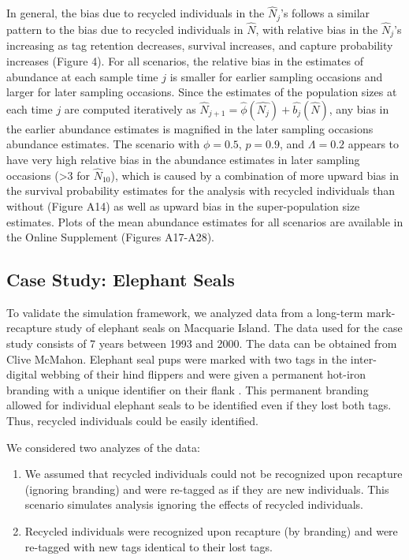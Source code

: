 \documentclass[12pt]{article}
\begin{document}
In general, the bias due to recycled individuals in the \(\hat{N}_j\)'s
follows a similar pattern to the bias due to recycled individuals in
\(\hat{N}\), with relative bias in the \(\hat{N}_j\)'s increasing as tag
retention decreases, survival increases, and capture probability
increases (Figure 4). For all scenarios, the relative bias in the
estimates of abundance at each sample time \(j\) is smaller for earlier
sampling occasions and larger for later sampling occasions. Since the
estimates of the population sizes at each time \(j\) are computed
iteratively as
\(\hat{N}_{j+1}=\hat{\phi}(\hat{N_j})+\hat{b_j}(\hat{N})\), any bias in
the earlier abundance estimates is magnified in the later sampling
occasions abundance estimates. The scenario with \(\phi=0.5\),
\(p=0.9\), and \(\Lambda=0.2\) appears to have very high relative bias
in the abundance estimates in later sampling occasions (\textgreater{}3
for \(\hat{N}_{10}\)), which is caused by a combination of more upward
bias in the survival probability estimates for the analysis with recycled
individuals than without (Figure A14) as well as upward bias in the
super-population size estimates. Plots of the mean abundance estimates
for all scenarios are available in the Online Supplement (Figures A17-A28).

\subsection{Case Study: Elephant
Seals}\label{case-study-elephant-seals-1}


To validate the simulation framework, we analyzed data from a long-term mark-recapture study of elephant seals on Macquarie Island. The data
used for the case study consists of 7 years between 1993 and 2000. The data can be obtained from Clive McMahon.
Elephant seal pups were marked with two tags in the inter-digital
webbing of their hind flippers and were given a permanent hot-iron
branding with a unique identifier on their flank \citep{McMahon:2009}. This
permanent branding allowed for individual elephant seals to be
identified even if they lost both tags. Thus, recycled individuals could
be easily identified.

We considered two analyzes of the data:

\begin{enumerate}
\def\labelenumi{\arabic{enumi}.}
\item
  We assumed that recycled individuals could not be recognized upon
  recapture (ignoring branding) and were re-tagged as if they are new
  individuals. This scenario simulates analysis ignoring the effects of
  recycled individuals.
\item
  Recycled individuals were recognized upon recapture (by branding) and were re-tagged with new tags identical to their lost tags.
\end{enumerate}
\end{document}

